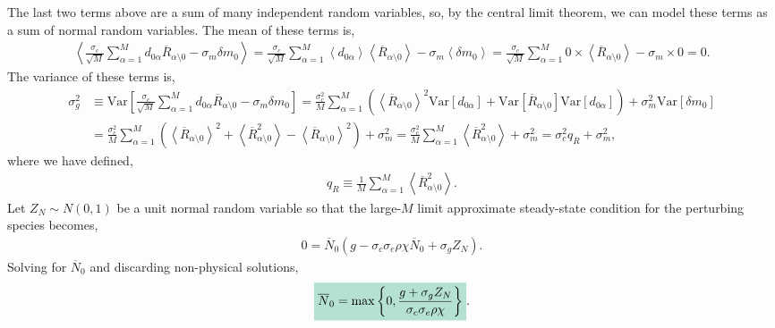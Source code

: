 \documentclass[10pt]{article}
\newcommand{\mathcolorbox}[1]{\colorbox{hlcol}{$\displaystyle #1$}}
\newcommand{\eval}[1]{\left\langle #1 \right\rangle}
\newcommand{\Var}[1]{\mathrm{Var}\left[ #1 \right]}
\begin{document}
The last two terms above are a sum of many independent random variables, so, by the central limit theorem, we can model these terms as a sum of normal random variables.
The mean of these terms is,
\begin{align}
	\eval{
		\frac{\sigma_c}{\sqrt{M}}\sum_{\alpha=1}^M
		d_{0\alpha} \overline R_{\alpha \setminus 0}
		-
		\sigma_m \delta m_0
	}
	=
		\frac{\sigma_c}{\sqrt{M}}\sum_{\alpha=1}^M
		\eval{d_{0\alpha}}\eval{ \overline R_{\alpha \setminus 0}}
		-
		\sigma_m \eval{\delta m_0}
		=
		\frac{\sigma_c}{\sqrt{M}}\sum_{\alpha=1}^M
		0\times\eval{ \overline R_{\alpha \setminus 0}}
		-
		\sigma_m \times 0
		=0.
\end{align}
The variance of these terms is,
\begin{align}
	\sigma_g^2
	&\equiv
	\Var{
		\frac{\sigma_c}{\sqrt{M}}
		\sum_{\alpha=1}^M d_{0\alpha} \overline R_{\alpha\setminus 0}
		-
		\sigma_m\delta m_0
	}
	=
	\frac{\sigma_c^2}{M}
	\sum_{\alpha=1}^M 
	\left(
		\eval{\overline R_{\alpha\setminus 0}}^2
		\Var{d_{0\alpha}}
		+
		\Var{\overline R_{\alpha\setminus0}}
		\Var{d_{0\alpha}}
	\right)
	+
	\sigma_m^2
	\Var{\delta m_0}
	\nonumber
	\\
	&=
	\frac{\sigma_c^2}{M}
	\sum_{\alpha=1}^M 
	\left(
		\eval{\overline R_{\alpha\setminus 0}}^2
		+
		\eval{\overline R_{\alpha\setminus0}^2}
		-
		\eval{\overline R_{\alpha\setminus0}}^2
	\right)
	+
	\sigma_m^2
	=
	\frac{\sigma_c^2}{M}
	\sum_{\alpha=1}^{M}
	\eval{\overline R_{\alpha\setminus 0}^2}
	+
	\sigma_m^2
	=
	\sigma_c^2 q_R + \sigma_m^2,
\end{align}
where we have defined,
\begin{align}
	q_R 
	\equiv 
	\frac{1}{M}
	\sum_{\alpha = 1}^M
	\eval{\overline R_{\alpha \setminus 0}^2}.
\end{align}
Let $Z_N\sim N(0,1)$ be a unit normal random variable so that the large-$M$ limit approximate steady-state condition for the perturbing species becomes,
\begin{align}
	0 = 
	\overline N_0
	\left(
		g 
		-
		\sigma_c\sigma_e\rho\chi\overline N_0
		+
		\sigma_g Z_N
	\right).
\end{align}
Solving for $\overline N_0$ and discarding non-physical solutions,
\begin{align}
	\mathcolorbox{
	\overline N_0
	=
	\max\left\{
		0,
		\frac{g + \sigma_g Z_N}{\sigma_c \sigma_e \rho\chi}
	\right\}
	}
	.
	\label{N0selfconsist}
\end{align}
\end{document}
